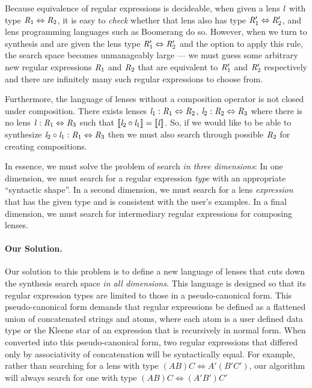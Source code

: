 \documentclass[numbers]{sigplanconf}
\begin{document}
Because equivalence of regular expressions is decideable, when
given a lens $\mathit{l}$ with type $\mathit{R}_1 \Leftrightarrow \mathit{R}_2$,
it is easy to \emph{check} whether that lens also has type 
$\mathit{R}_1' \Leftrightarrow \mathit{R}_2'$, and lens programming languages
such as Boomerang \cite{foster:thesis} do so.  However, 
when we turn to synthesis and are given the lens type 
$\mathit{R}_1' \Leftrightarrow \mathit{R}_2'$ and the option to apply this
rule, the search space becomes unmanageably large --- we must guess
some arbitrary new regular expressions $\mathit{R}_1$ and $\mathit{R}_2$ that are
equivalent to  $\mathit{R}_1'$ and $\mathit{R}_2'$ respectively
and there are infinitely many such regular expressions to choose
from.

Furthermore, the language of lenses without a composition operator is not closed
under composition.  There exists lenses $\mathit{l}_1 : \mathit{R}_1 \Leftrightarrow
\mathit{R}_2$, $\mathit{l}_2 : \mathit{R}_2 \Leftrightarrow \mathit{R}_3$ where there is no
lens $\mathit{l} : \mathit{R}_1 \Leftrightarrow \mathit{R}_3$ such that
$[ \! [\mathit{l}_2 \circ \mathit{l}_1] \! ]=[ \! [\mathit{l}] \! ]$.  So, if we
would like to be able to synthesize $\mathit{l}_2 \circ \mathit{l}_1 :
\mathit{R}_1 \Leftrightarrow \mathit{R}_3$ then we
must also search through possible $\mathit{R}_2$ for creating compositions.

In essence,
we must solve the problem of search \emph{in three dimensions}:  In one
dimension, we must search for a regular expression \emph{type}
with an appropriate ``syntactic shape''.  In a second dimension,
we must search for a lens \emph{expression} that has the given type and
is consistent with the user's examples.  In a final dimension, we must search
for intermediary regular expressions for composing lenses.

\paragraph*{Our Solution.}  Our solution to this problem is to define
a new language of lenses that
cuts down the synthesis search space \emph{in all dimensions}.
This language is designed so that its regular expression types are limited 
to those in a pseudo-canonical form.  This pseudo-canonical form
demands that regular expressions be defined as a flattened 
union of concatenated strings and atoms, where each atom is a user defined data
type or the Kleene star of an expression that is recursively in normal form.
When converted into this pseudo-canonical form, two regular expressions that 
differed only by associativity of concatenation will be syntactically equal.
For example, rather than searching for a lens with type 
 $(A B) C \Leftrightarrow A' (B' C')$, our algorithm will always search
for one with type  $(A B) C \Leftrightarrow (A' B') C'$
  
\end{document}
